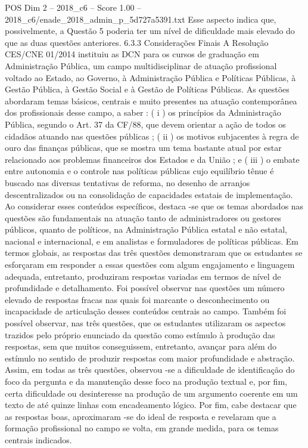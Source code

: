 \begin{textsample}{POS Dim 2 – 2018\_c6 – Score 1.00 – 2018\_c6/enade\_2018\_admin\_p\_5d727a5391.txt}
Esse aspecto indica que, possivelmente, a Questão 5 poderia ter um nível de dificuldade mais elevado do que as duas questões anteriores. 6.3.3 Considerações Finais A Resolução CES/CNE 01/2014 instituiu as DCN para os cursos de graduação em Administração Pública, um campo multidisciplinar de atuação profissional voltado ao Estado, ao Governo, à Administração Pública e Políticas Públicas, à Gestão Pública, à Gestão Social e à Gestão de Políticas Públicas.
As questões abordaram temas básicos, centrais e muito presentes na atuação contemporânea dos profissionais desse campo, a saber : ( i ) os princípios da Administração Pública, segundo o Art. 37 da CF/88, que devem orientar a ação de todos os cidadãos atuando nas questões públicas ; ( ii ) os motivos subjacentes à regra de ouro das finanças públicas, que se mostra um tema bastante atual por estar relacionado aos problemas financeiros dos Estados e da União ; e ( iii ) o embate entre autonomia e o controle nas políticas públicas cujo equilíbrio tênue é buscado nas diversas tentativas de reforma, no desenho de arranjos descentralizados ou na consolidação de capacidades estatais de implementação.
Ao considerar esses conteúdos específicos, destaca -se que os temas abordados nas questões são fundamentais na atuação tanto de administradores ou gestores públicos, quanto de políticos, na Administração Pública estatal e não estatal, nacional e internacional, e em analistas e formuladores de políticas públicas.
Em termos globais, as respostas das três questões demonstraram que os estudantes se esforçaram em responder a essas questões com algum engajamento e linguagem adequada, entretanto, produziram respostas variadas em termos de nível de profundidade e detalhamento.
Foi possível observar nas questões um número elevado de respostas fracas nas quais foi marcante o desconhecimento ou incapacidade de articulação desses conteúdos centrais ao campo.
Também foi possível observar, nas três questões, que os estudantes utilizaram os aspectos trazidos pelo próprio enunciado da questão como estímulo à produção das respostas, sem que muitos conseguissem, entretanto, avançar para além do estímulo no sentido de produzir respostas com maior profundidade e abstração.
Assim, em todas as três questões, observou -se a dificuldade de identificação do foco da pergunta e da manutenção desse foco na produção textual e, por fim, certa dificuldade ou desinteresse na produção de um argumento coerente em um texto de até quinze linhas com encadeamento lógico.
Por fim, cabe destacar que as respostas boas, aproximaram -se do ideal de resposta e revelaram que a formação profissional no campo se volta, em grande medida, para os temas centrais indicados.

\end{textsample}
